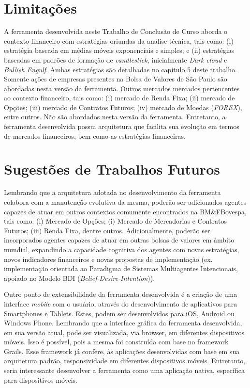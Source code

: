 \section{Limitações}

A ferramenta desenvolvida neste Trabalho de Conclusão de Curso aborda o contexto financeiro com estratégias oriundas da análise técnica, tais como: (i) estratégia baseada em médias móveis exponenciais e simples; e (ii) estratégias baseadas em padrões de formação de \textit{candlestick}, inicialmente \textit{Dark cloud} e \textit{Bullish Engulf}. Ambas estratégias são detalhadas no capítulo 5 deste trabalho. Somente ações de empresas presentes na Bolsa de Valores de São Paulo são abordadas nesta versão da ferramenta. Outros mercados mercados pertencentes ao contexto financeiro, tais como: (i) mercado de Renda Fixa; (ii) mercado de Opções; (iii) mercado de Contratos Futuros; (iv) mercado de Moedas (\textit{FOREX}), entre outros. Não são abordados nesta versão da ferramenta. Entretanto, a ferramenta desenvolvida possui arquitetura que facilita sua evolução em termos de mercados financeiros, bem como as estratégias financeiras.



\section{Sugestões de Trabalhos Futuros}

Lembrando que a arquitetura adotada no desenvolvimento da ferramenta colabora com a manutenção evolutiva da mesma, poderão ser adicionados agentes capazes de atuar em outros contextos comumente encontrados na BM\&FBovespa, tais como: (i) Mercado de Opções; (i) Mercado de Mercadorias e Contratos Futuros; (iii) Renda Fixa, dentre outros. Adicionalmente, poderão ser incorporados agentes capazes de atuar em outras bolsas de valores em âmbito mundial, expandindo a capacidade cognitiva dos agentes com novas estratégias, novos indicadores financeiros e novas propostas de implementação (ex. implementação orientada ao Paradigma de Sistemas Multiagentes Intencionais, apoiado no Modelo BDI (\textit{Belief-Desire-Intention})).

Outro ponto de extensibilidade da ferramenta desenvolvida é a criação de uma interface \textit{mobile} com o usuário, através do desenvolvimento de aplicativos para Smartphones e Tablets. Estes, podem ser desenvolvidos para iOS, Android ou Windows Phone. Lembrando que a interface gráfica da ferramenta desenvolvida, em sua versão atual, pode ser visualizada, via browser, em diferentes dispositivos móveis. Isso é possível, pois a mesma foi construída com base no framework Grails. Esse framework já confere, às aplicações desenvolvidas com base em sua arquitetura padrão, responsividade em diferentes dispositivos móveis. Entretanto, seria interessante desenvolver a ferramenta como uma aplicação nativa, específica para dispositivos móveis.

